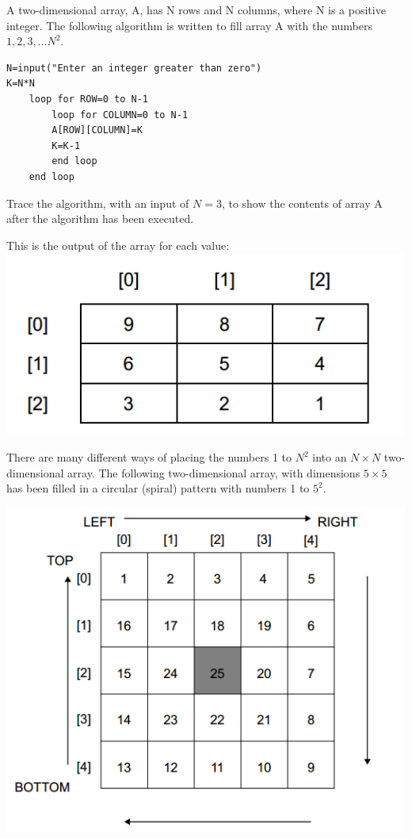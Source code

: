 \begin{exercise*}%
A two-dimensional array, A, has N rows and N columns, where N is a positive integer.
The following algorithm is written to fill array A with the numbers $1, 2, 3,\ldots N^2$.
\begin{Verbatim}[tabsize=4]
N=input("Enter an integer greater than zero")
K=N*N
	loop for ROW=0 to N-1
		loop for COLUMN=0 to N-1
		A[ROW][COLUMN]=K
		K=K-1
		end loop
	end loop
\end{Verbatim}

\begin{parts}
\item Trace the algorithm, with an input of $N=3$, to show the contents of array A after the algorithm has been executed.
	\begin{solution}
	This is the output of the array for each value:
	\includegraphics{topic_4_intro_programming/topic_4_exercises/arraySolution}
	\end{solution}
\end{parts}
There are many different ways of placing the numbers 1 to $N^2$ into an $N \times N$ two-dimensional array. 
The following two-dimensional array, with dimensions $5 \times 5$ has been filled in a circular (spiral) pattern with numbers 1 to $5^2$.

\includegraphics[scale=0.6]{topic_4_intro_programming/topic_4_exercises/array}
\newline


\end{exercise*}
